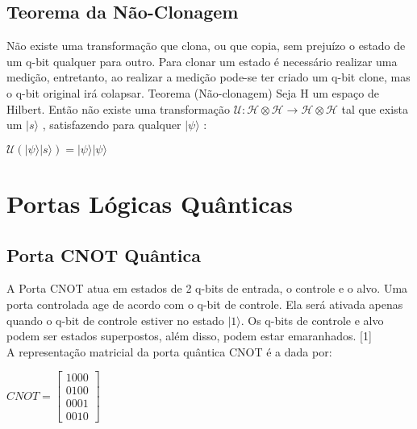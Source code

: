\documentclass[12pt, a4paper, oneside]{article}
\begin{document}
\subsection{Teorema da Não-Clonagem}

\par Não existe uma transformação que clona, ou que copia, sem prejuízo o estado de um q-bit
qualquer para outro. Para clonar um estado é necessário realizar uma medição, entretanto,
ao realizar a medição pode-se ter criado um q-bit clone, mas o q-bit original irá colapsar.
Teorema (Não-clonagem) Seja H um espaço de Hilbert. Então não existe uma transformação $ \mathcal{U : H} \otimes  \mathcal{H} \rightarrow  \mathcal{H}  \otimes \mathcal{H}$  tal que exista um $| s \rangle$ , satisfazendo para qualquer $| \psi \rangle$ :
\begin{center}
$\mathcal{U} (| \psi \rangle | s \rangle) = | \psi \rangle| \psi \rangle$
\end{center}


\section{Portas Lógicas Quânticas}

\subsection{Porta CNOT Quântica}

\par A Porta CNOT atua em estados de 2 q-bits de entrada, o controle e o alvo. Uma porta
controlada age de acordo com o q-bit de controle. Ela será ativada apenas quando o q-bit de
controle estiver no estado $| 1 \rangle$. Os q-bits de controle e alvo podem ser estados superpostos,
além disso, podem estar emaranhados. [1]\\
A representação matricial da porta quântica CNOT é a dada por:\\
\begin{center}
$
CNOT = \left[
\begin{array}{cccc}
1 0 0 0 \\
0 1 0 0 \\
0 0 0 1 \\
0 0 1 0
\end{array}
\right]
$
\end{center}
\newpage
\end{document}
